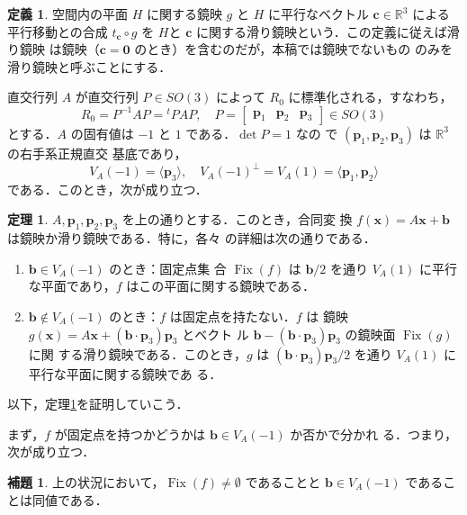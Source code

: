 \documentclass[11pt, uplatex, dvipdfmx, titlepage]{jsarticle}
\DeclareMathOperator{\Fix}{Fix}
\theoremstyle{definition}
\newtheorem{theorem}{定理}[section]
\newtheorem*{definition}{定義}
\newtheorem{lemma}{補題}[section]
\begin{document}
\begin{definition}
  空間内の平面 $H$ に関する鏡映 $g$ と $H$ に平行なベクトル $\bm{c}
  \in \mathbb{R}^3$ による平行移動との合成 $t_{\bm{c}} \circ
  g$ を $H$と $\bm{c}$ に関する滑り鏡映という．この定義に従えば滑り鏡映
  は鏡映（$\bm{c}=\bm{0}$ のとき）を含むのだが，本稿では鏡映でないもの
  のみを滑り鏡映と呼ぶことにする．
\end{definition}


直交行列 $A$ が直交行列 $P \in SO(3)$ によって $R_{0}$ に標準化される，すなわち，
\[
  R_{0} = P^{-1}AP = {}^{t}PAP, \quad P=\left[
    \begin{array}{ccc}
      \bm{p}_1 & \bm{p}_2 & \bm{p}_3
    \end{array}
  \right] \in SO(3)
\]
とする．$A$ の固有値は $-1$ と $1$ である．$\det P=1$ なの
で $(\bm{p}_1, \bm{p}_2, \bm{p}_3)$ は $\mathbb{R}^3$ の右手系正規直交
基底であり，
\[
  V_A(-1) = \langle \bm{p}_3\rangle, \quad V_A(-1)^{\perp} = V_A(1)
  =\langle \bm{p}_1, \bm{p}_2 \rangle
\]
である．このとき，次が成り立つ．

\begin{theorem}\label{thm:RefOrGlide3}
  $A, \bm{p}_1, \bm{p}_2, \bm{p}_3$ を上の通りとする．このとき，合同変
  換 $f(\bm{x}) = A\bm{x} + \bm{b}$ は鏡映か滑り鏡映である．特に，各々
  の詳細は次の通りである．
  \begin{enumerate}[(1)]
  \item $\bm{b} \in V_A(-1)$ のとき：固定点集
    合 $\Fix(f)$ は $\bm{b}/2$ を通り $V_A(1)$ に平行な平面であり，$f$
    はこの平面に関する鏡映である．

  \item $\bm{b} \not\in V_A(-1)$ のとき：$f$ は固定点を持たない．$f$ は
    鏡映 $g(\bm{x})=A\bm{x} + (\bm{b}\cdot \bm{p}_3)\bm{p}_3$ とベクト
    ル $\bm{b}-(\bm{b}\cdot \bm{p}_3)\bm{p}_3$ の鏡映面 $\Fix(g)$ に関
    する滑り鏡映である．このとき，$g$ は $(\bm{b}\cdot
    \bm{p}_3)\bm{p}_3/2$ を通り $V_A(1)$ に平行な平面に関する鏡映であ
    る．
  \end{enumerate}
\end{theorem}

以下，定理\ref{thm:RefOrGlide3}を証明していこう．

まず，$f$ が固定点を持つかどうかは $\bm{b} \in V_A(-1)$ か否かで分かれ
る．つまり，次が成り立つ．

\begin{lemma}\label{lem:RefOrGlide3}
  上の状況において，$\Fix(f) \neq \emptyset$ であることと $\bm{b} \in
  V_A(-1)$ であることは同値である．
\end{lemma}
\end{document}
